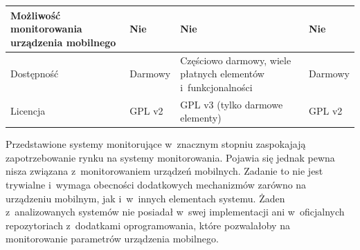 \begin{longtable}[c]{|p{4.5cm}||p{3cm}|p{3cm}|p{3cm}|}
  \raggedright{Możliwość monitorowania urządzenia mobilnego} & \raggedright{Nie} &
  \raggedright{Nie} & \raggedright{Nie}
  \tabularnewline
  \hline

  \raggedright{Dostępność} & \raggedright{Darmowy} &
  \raggedright{Częściowo darmowy, wiele płatnych elementów i~funkcjonalności} & \raggedright{Darmowy}
  \tabularnewline
  \hline

  \raggedright{Licencja} & \raggedright{GPL v2} &
  \raggedright{GPL v3 (tylko darmowe elementy)} & \raggedright{GPL v2}
  \tabularnewline
  \hline

\end{longtable}

Przedstawione systemy monitorujące w~znacznym stopniu zaspokajają
zapotrzebowanie rynku na systemy monitorowania. Pojawia się jednak
pewna nisza związana z~monitorowaniem urządzeń mobilnych. Zadanie to
nie jest trywialne i~wymaga obecności dodatkowych mechanizmów zarówno
na urządzeniu mobilnym, jak i~w~innych elementach systemu. Żaden
z~analizowanych systemów nie posiadał w~swej implementacji ani
w~oficjalnych repozytoriach z~dodatkami oprogramowania, które
pozwalałoby na monitorowanie parametrów urządzenia mobilnego.

